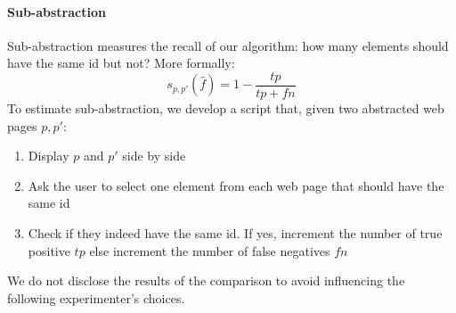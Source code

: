 \paragraph{Sub-abstraction}
 Sub-abstraction measures the recall of our algorithm: how many elements should have the same id but not?
 More formally:
 \begin{equation}
s_{p, p'}(\hat{f}) = 1 - \frac{tp}{tp + fn}
\end{equation}
 To estimate sub-abstraction, we develop a script that, given two abstracted web pages $p, p'$:
\begin{enumerate}
\item Display $p$ and $p'$ side by side
\item Ask the user to select one element from each web page that should have the same id
\item Check if they indeed have the same id. If yes, increment the number of true positive $tp$ else increment the number of false negatives $fn$
\end{enumerate}

We do not disclose the results of the comparison to avoid influencing the following experimenter's choices.



